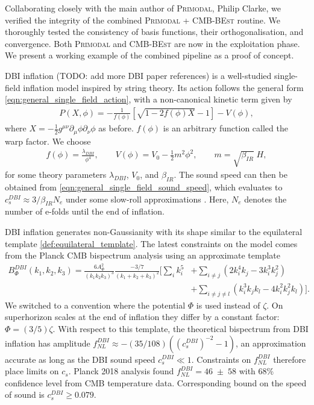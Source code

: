 Collaborating closely with the main author of \textsc{Primodal}, Philip Clarke, we verified the integrity of the combined \textsc{Primodal} + \textsc{CMB-BEst} routine. We thoroughly tested the consistency of basis functions, their orthogonalisation, and convergence. Both \textsc{Primodal} and \textsc{CMB-BEst} are now in the exploitation phase. We present a working example of the combined pipeline as a proof of concept.

DBI inflation \cite{Silverstein2004dbi,Alishahiha2004dbi,Chen2005runningdbi,Bean2008comparingdbi} (TODO: add more DBI paper references) is a well-studied single-field inflation model inspired by string theory. Its action follows the general form \eqref{eqn:general_single_field_action}, with a non-canonical kinetic term given by
\begin{align}
	P(X,\phi) = - \frac{1}{f(\phi)} \left[ \sqrt{1 - 2f(\phi)X} - 1 \right] - V(\phi),
\end{align}
where $X=-\frac{1}{2} g^{\mu\nu} \partial_\mu \phi \partial_\nu \phi$ as before. $f(\phi)$ is an arbitrary function called the warp factor. We choose
\begin{align}
	f(\phi) = \frac{\lambda_{DBI}}{\phi^4}, \qquad V(\phi) = V_0 - \frac{1}{2}m^2\phi^2, \qquad m = \sqrt{\beta_{IR}} \; H,
\end{align}
for some theory parameters $\lambda_{DBI}$, $V_0$, and $\beta_{IR}$. The sound speed can then be obtained from \eqref{eqn:general_single_field_sound_speed}, which evaluates to $c^{DBI}_s \approx 3/\beta_{IR} N_e$ under some slow-roll approximations \cite{Chen2005runningdbi}. Here, $N_e$ denotes the number of e-folds until the end of inflation.

DBI inflation generates non-Gaussianity with its shape similar to the equilateral template \eqref{def:equilateral_template}. The latest constraints on the model comes from the Planck CMB bispectrum analysis using an approximate template 
\begin{align}
	B_\Phi^{DBI}(k_1,k_2,k_3) = \frac{6A_\Phi^2}{(k_1 k_2 k_3)^3} \frac{-3/7}{(k_1 + k_2 + k_3)^2} \bigg[ \sum_i k_i^5 &+ \sum_{i\neq j} (2k_i^4 k_j - 3k_i^3 k_j^2)  \nonumber \\
	&+ \sum_{i\neq j\neq l} (k_i^3 k_j k_l - 4k_i^2 k_j^2 k_l) \bigg]. \label{eqn:dbi_bispectrum_template}
\end{align}
We switched to a convention where the potential $\Phi$ is used instead of $\zeta$. On superhorizon scales at the end of inflation they differ by a constant factor: $\Phi = (3/5)\zeta$. With respect to this template, the theoretical bispectrum from DBI inflation has amplitude $f_{NL}^{DBI} \approx - (35/108)((c^{DBI}_s)^{-2}-1)$, an approximation accurate as long as the DBI sound speed $c^{DBI}_s \ll 1$. Constraints on $f_{NL}^{DBI}$ therefore place limits on $c_s$. Planck 2018 analysis \cite{PlanckCollaboration2018} found $f_{NL}^{DBI} = 46 \;\pm\; 58$ with 68\% confidence level from CMB temperature data. Corresponding bound on the speed of sound is $c^{DBI}_s \ge 0.079$.

